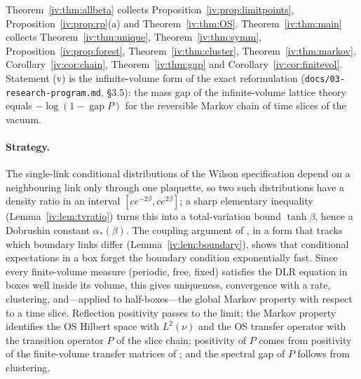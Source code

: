 \documentclass[11pt,a4paper]{article}
\theoremstyle{definition}
\theoremstyle{remark}
\DeclareMathOperator{\gap}{gap}
\newcommand{\Fref}[3]{\cite[#1~`#2' (\texttt{#3})]{F}}
\newcommand{\aS}{\alpha_*}
\begin{document}
Theorem~\ref{iv:thm:allbeta} collects Proposition~\ref{iv:prop:limitpoints}, Proposition~\ref{iv:prop:rp}(a) and
Theorem~\ref{iv:thm:OS}. Theorem~\ref{iv:thm:main} collects Theorem~\ref{iv:thm:unique}, Theorem~\ref{iv:thm:symm},
Proposition~\ref{iv:prop:forest}, Theorem~\ref{iv:thm:cluster}, Theorem~\ref{iv:thm:markov}, Corollary~\ref{iv:cor:chain},
Theorem~\ref{iv:thm:gap} and Corollary~\ref{iv:cor:finitevol}. Statement (v) is the infinite-volume form of the exact
reformulation \Fref{Theorem}{Exact reformulation of the gap}{thm:chain} (\texttt{docs/03-research-program.md}, \S3.5):
the mass gap of the infinite-volume lattice theory equals $-\log(1-\gap P)$ for the reversible Markov chain of time
slices of the vacuum.

\paragraph{Strategy.} The single-link conditional distributions of the Wilson specification depend on a neighbouring link
only through one plaquette, so two such distributions have a density ratio in an interval $[ce^{-2\beta},ce^{2\beta}]$; a
sharp elementary inequality (Lemma~\ref{iv:lem:tvratio}) turns this into a total-variation bound $\tanh\beta$, hence a
Dobrushin constant $\aS(\beta)$. The coupling argument of \Fref{Theorem}{Covariance bound under Dobrushin's
condition}{thm:dobrushin}, in a form that tracks which boundary links differ (Lemma~\ref{iv:lem:boundary}), shows that
conditional expectations in a box forget the boundary condition exponentially fast. Since every finite-volume measure
(periodic, free, fixed) satisfies the DLR equation in boxes well inside its volume, this gives uniqueness, convergence with
a rate, clustering, and---applied to half-boxes---the global Markov property with respect to a time slice. Reflection
positivity passes to the limit; the Markov property identifies the OS Hilbert space with $L^2(\nu)$ and the OS transfer
operator with the transition operator $P$ of the slice chain; positivity of $P$ comes from positivity of the
finite-volume transfer matrices of \cite{F}; and the spectral gap of $P$ follows from clustering.
\end{document}
